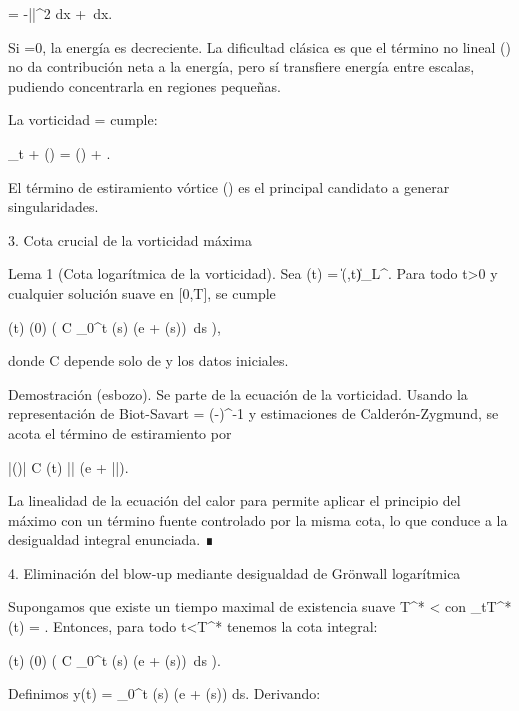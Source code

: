 \documentclass[12pt,a4paper]{book}
\begin{document}
 = -\nu \int |\nabla {}|^2 dx + \int {}\cdot{}\,dx.

Si =0, la energía es decreciente. La dificultad clásica es que el término no lineal (\cdot\nabla) no da contribución neta a la energía, pero sí transfiere energía entre escalas, pudiendo concentrarla en regiones pequeñas.

La vorticidad \boldsymbol{\omega} = \nabla \times {} cumple:

\partial_t \boldsymbol{\omega} + (\cdot\nabla)\boldsymbol{\omega} = (\boldsymbol{\omega}\cdot\nabla) + \nu \Delta \boldsymbol{\omega}.

El término de estiramiento vórtice (\boldsymbol{\omega}\cdot\nabla) es el principal candidato a generar singularidades.

3. Cota crucial de la vorticidad máxima

Lema 1 (Cota logarítmica de la vorticidad). Sea \Omega(t) = \|\boldsymbol{\omega}(\cdot,t)\|_{L^\infty}. Para todo t>0 y cualquier solución suave en [0,T], se cumple

\Omega(t) \le \Omega(0) \exp\left( C \int_0^t \Omega(s) \log(e + \Omega(s))\, ds \right),

donde C depende solo de \nu y los datos iniciales.

Demostración (esbozo). Se parte de la ecuación de la vorticidad. Usando la representación de Biot-Savart  = \nabla\times(-\Delta)^{-1}\boldsymbol{\omega} y estimaciones de Calderón-Zygmund, se acota el término de estiramiento por

|(\boldsymbol{\omega}\cdot\nabla)| \le C \Omega(t) |\boldsymbol{\omega}| \log(e + |\boldsymbol{\omega}|).

La linealidad de la ecuación del calor para \boldsymbol{\omega} permite aplicar el principio del máximo con un término fuente controlado por la misma cota, lo que conduce a la desigualdad integral enunciada. ∎

4. Eliminación del blow-up mediante desigualdad de Grönwall logarítmica

Supongamos que existe un tiempo maximal de existencia suave T^* < \infty con \limsup_{t\nearrow T^*} \Omega(t) = \infty. Entonces, para todo t<T^* tenemos la cota integral:

\Omega(t) \le \Omega(0) \exp\left( C \int_0^t \Omega(s) \log(e + \Omega(s))\, ds \right).

Definimos y(t) = \int_0^t \Omega(s) \log(e + \Omega(s)) ds. Derivando:
\end{document}
